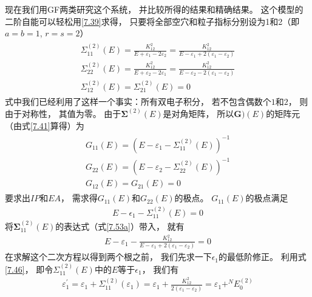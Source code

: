 现在我们用GF两类研究这个系统，
并比较所得的结果和精确结果。
这个模型的二阶自能可以轻松用\eqref{7.39}求得，
只要将全部空穴和粒子指标分别设为1和2（即$a=b=1$, 
$r=s=2$）
\begin{subequations}
    \begin{align}\begin{array}{l}
    \Sigma_{11}^{(2)}(E)=\frac{K_{12}^{2}}{E+\varepsilon_{1}-2 \varepsilon_{2}}=\frac{K_{12}^{2}}{E-\varepsilon_{1}+2\left(\varepsilon_{1}-\varepsilon_{2}\right)} \label{7.53a}\\
    \Sigma_{22}^{(2)}(E)=\frac{K_{12}^{2}}{E+\varepsilon_{2}-2 \varepsilon_{1}}=\frac{K_{12}^{2}}{E-\varepsilon_{2}-2\left(\varepsilon_{1}-\varepsilon_{2}\right)} \\
    \Sigma_{12}^{(2)}(E)=\Sigma_{21}^{(2)}(E)=0
    \end{array}\end{align}
\end{subequations}
式中我们已经利用了这样一个事实：所有双电子积分，
若不包含偶数个$1$和$2$，
则由于对称性，
其值为零。
由于$\mathbf{\Sigma}^{(2)}(E)$是对角矩阵，
所以$\mathbf{G})(E)$的矩阵元（由式\eqref{7.41}算得）为
\begin{subequations}
\begin{align}\begin{array}{l}
G_{11}(E)=\left(E-\varepsilon_{1}-\Sigma_{11}^{(2)}(E)\right)^{-1} \\
G_{22}(E)=\left(E-\varepsilon_{2}-\Sigma_{22}^{(2)}(E)\right)^{-1} \\
G_{12}(E)=G_{21}(E)=0
\end{array}\end{align}
\end{subequations}
要求出$IP$和$EA$，
需求得$G_{11}(E)$和$G_{22}(E)$的极点。
$G_{11}(E)$的极点满足
\begin{align}
E - \epsilon_1 - \Sigma_{11}^{(2)}(E) = 0
\end{align}
将$\mathbf{\Sigma}_{11}^{(2)}(E)$的表达式（式\eqref{7.53a}）带入，
就有
\begin{align}
    E-\varepsilon_{1}-\frac{K_{12}^{2}}{E-\varepsilon_{1}+2\left(\varepsilon_{1}-\varepsilon_{2}\right)}=0
\end{align}
在求解这个二次方程以得到两个根之前，
我们先求一下$\epsilon_1$的最低阶修正。
利用式\eqref{7.46}，
即令$\Sigma_{11}^{(2)}(E)$中的$E$等于$\epsilon_{1}$，
我们有
\begin{align}
\varepsilon_{1}^{\prime}=\varepsilon_{1}+\Sigma_{11}^{(2)}\left(\varepsilon_{1}\right)=\varepsilon_{1}+\frac{K_{12}^{2}}{2\left(\varepsilon_{1}-\varepsilon_{2}\right)}=\varepsilon_{1}+ ^NE_{0}^{(2)}
\end{align}
